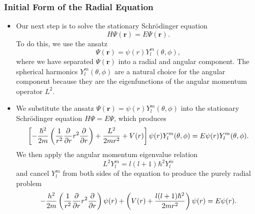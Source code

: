 \documentclass[11pt, a4paper]{article}
\newcommand{\Schro}{Schr\"{o}dinger\xspace}
\renewcommand{\vec}[1]{\bm{#1}}  %
\renewcommand{\r}{\vec{r}}  %
\newcommand{\p}{\psi}  %
\renewcommand{\P}{\Psi}  %
\begin{document}
\subsubsection{Initial Form of the Radial Equation}
\begin{itemize}
    \item Our next step is to solve the stationary \Schro equation
	\begin{equation*}
		H\P(\r) = E\P(\r).
	\end{equation*}
	To do this, we use the ansatz
	\begin{equation*}
		\P(\r) = \p(r)Y_{l}^{m}(\theta, \phi),
	\end{equation*}
	where we have separated $ \P(\r) $ into a radial and angular component. The spherical harmonics $ Y_{l}^{m}(\theta, \phi) $ are a natural choice for the angular component because they are the eigenfunctions of the angular momentum operator $ L^{2} $.
	
    \item We substitute the ansatz $ \P(\r) = \p(r)Y_{l}^{m}(\theta, \phi) $ into the stationary \Schro equation $ H \P = E \P $, which produces
    \begin{equation*}
    \left[ - \frac{\hbar^{2}}{2m} \left( \frac{1}{r^{2}}\pdv{r}r^{2}\pdv{r} \right) + \frac{L^{2}}{2mr^{2}} + V(r)
        \right] \p(r)Y_{l}^{m}(\theta, \phi) = E \p(r)Y_{l}^{m}(\theta, \phi).
    \end{equation*}
    We then apply the angular momentum eigenvalue relation
	\begin{equation*}
		L^{2} Y_{l}^{m} = l (l+1)\hbar^{2} Y_{l}^{m}
	\end{equation*}
	and cancel $ Y_{l}^{m} $ from both sides of the equation to produce the purely radial problem
	\begin{equation*}
		- \frac{h^{2}}{2m} \left(\frac{1}{r^{2}} \pdv{r}r^{2} \pdv{r}\right)\p(r) + \left(V(r) + \frac{l (l+1)\hbar^{2}}{2mr^{2}}\right)\p(r) = E\p(r).
	\end{equation*}
	
\end{itemize}
\end{document}
